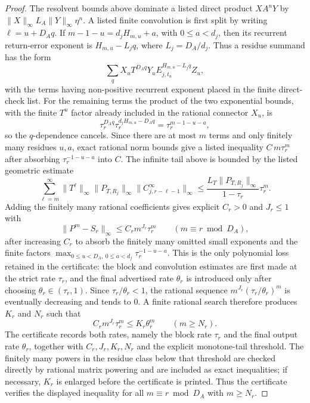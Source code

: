 \begin{proof}
  The resolvent bounds above dominate a listed direct product
  \(X A^n Y\) by
  \(\|X\|_\infty L_A\|Y\|_\infty\eta^n\). A listed finite convolution is
  first split by writing \(\ell=u+D_Aq\). If
  \(m-1-u=d_jH_{m,u}+a\), with \(0\le a<d_j\), then its recurrent
  return-error exponent is \(H_{m,u}-L_jq\), where
  \(L_j=D_A/d_j\). Thus a residue summand has the form
  \[
    \sum_q X_uT^{D_Aq}Y_uE_{j,t_u}^{H_{m,u}-L_jq}Z_u,
  \]
  with the terms having non-positive recurrent exponent placed in the
  finite direct-check list. For the remaining terms the product of the
  two exponential bounds, with the finite \(T^u\) factor already included
  in the rational connector \(X_u\), is
  \[
    \tau_r^{D_Aq}\tau_r^{d_jH_{m,u}-D_Aq}
      =\tau_r^{m-1-u-a},
  \]
  so the \(q\)-dependence cancels. Since there are at most \(m\) terms
  and only finitely many residues \(u,a\), exact rational norm bounds
  give a listed inequality \(C\,m\tau_r^m\) after absorbing
  \(\tau_r^{-1-u-a}\) into \(C\). The infinite tail above is bounded by the
  listed geometric estimate
  \[
    \sum_{\ell=m}^{\infty}
      \|T^\ell\|_\infty\|P_{T,R_j}\|_\infty
      \|C_{j,r-\ell-1}^{\infty}\|_\infty
    \le
    \frac{L_T\|P_{T,R_j}\|_\infty}{1-\tau_r}\tau_r^m .
  \]
  Adding the finitely many rational coefficients gives explicit
  \(C_r>0\) and \(J_r\le1\) with
  \[
    \|P^m-S_r\|_\infty\le C_rm^{J_r}\tau_r^m
    \qquad(m\equiv r\bmod D_A),
  \]
  after increasing \(C_r\) to absorb the finitely many omitted small
  exponents and the finite factors
  \(\max_{0\le u<D_A,\ 0\le a<d_j}\tau_r^{-1-u-a}\). This is the only
  polynomial loss retained in the certificate: the block and convolution
  estimates are first made at the strict rate \(\tau_r\), and the final
  advertised rate \(\theta_r\) is introduced only after choosing
  \(\theta_r\in(\tau_r,1)\). Since \(\tau_r/\theta_r<1\), the rational
  sequence \(m^{J_r}(\tau_r/\theta_r)^m\) is eventually decreasing and
  tends to \(0\). A finite rational search therefore produces \(K_r\)
  and \(N_r\) such that
  \[
    C_rm^{J_r}\tau_r^m\le K_r\theta_r^m
    \qquad(m\ge N_r).
  \]
  The certificate records both rates, namely the block rate \(\tau_r\)
  and the final output rate \(\theta_r\), together with
  \(C_r,J_r,K_r,N_r\) and the explicit monotone-tail threshold. The
  finitely many powers in the
  residue class below that threshold are checked directly by rational
  matrix powering and are included as exact inequalities; if necessary,
  \(K_r\) is enlarged before the certificate is printed. Thus the
  certificate verifies the displayed inequality for all
  \(m\equiv r\bmod D_A\) with \(m\ge N_r\).


\end{proof}
